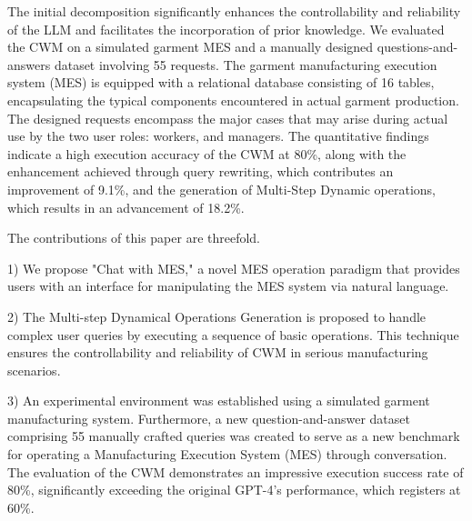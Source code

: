 \documentclass[preprint,12pt]{elsarticle}
\begin{document}
The initial decomposition significantly enhances the controllability and reliability of the LLM and facilitates the incorporation of prior knowledge.
We evaluated the CWM on a simulated garment MES and a manually designed questions-and-answers dataset involving 55 requests.
The garment manufacturing execution system (MES) is equipped with a relational database consisting of 16 tables, encapsulating the typical components encountered in actual garment production.
The designed requests encompass the major cases that may arise during actual use by the two user roles: workers, and managers.
The quantitative findings indicate a high execution accuracy of the CWM at 80\%, along with the enhancement achieved through query rewriting, which contributes an improvement of 9.1\%, and the generation of Multi-Step Dynamic operations, which results in an advancement of 18.2\%.




The contributions of this paper are threefold.

1) We propose "Chat with MES," a novel MES operation paradigm that provides users with an interface for manipulating the MES system via natural language.

2) The Multi-step Dynamical Operations Generation is proposed to handle complex user queries by executing a sequence of basic operations. This technique ensures the controllability and reliability of CWM in serious manufacturing scenarios.

3) An experimental environment was established using a simulated garment manufacturing system. Furthermore, a new question-and-answer dataset comprising 55 manually crafted queries was created to serve as a new benchmark for operating a Manufacturing Execution System (MES) through conversation.  
The evaluation of the CWM demonstrates an impressive execution success rate of 80\%, significantly exceeding the original GPT-4's performance, which registers at 60\%.
\end{document}
